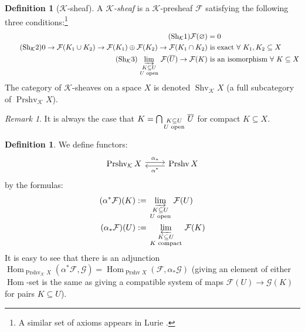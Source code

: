 \documentclass[12pt]{article}
\theoremstyle{definition}
\newtheorem{definition}[theorem]{Definition}
\theoremstyle{remark}
\newtheorem{remark}[theorem]{Remark}
\numberwithin{equation}{subsection}
\newcommand{\F}{\mathcal F}
\newcommand{\G}{\mathcal G}
\newcommand{\K}{\mathcal K}
\newcommand{\Hom}{\operatorname{Hom}}
\newcommand{\Prshv}{\operatorname{Prshv}}
\newcommand{\Shv}{\operatorname{Shv}}
\begin{document}
\begin{definition}[$\K$-sheaf]
A \emph{$\K$-sheaf} is a $\K$-presheaf $\F$ satisfying the following three conditions:\footnote{A similar set of axioms appears in Lurie \cite[Definition 7.3.4.1]{luriehtt}.}
\begin{align*}
\tag{Sh$_\K$1}\label{sheafvanishing}\F(\varnothing)&=0\\
\tag{Sh$_\K$2}\label{sheafproperty}0\to\F(K_1\cup K_2)\to\F(K_1)\oplus\F(K_2)\to\F(K_1\cap K_2)&\text{ is exact }\forall\text{ }K_1,K_2\subseteq X\\
\tag{Sh$_\K$3}\label{sheafcontinuity}\varinjlim_{\begin{smallmatrix}K\subseteq U\cr U\textrm{ open}\end{smallmatrix}}\F(\overline U)\to\F(K)&\text{ is an isomorphism }\forall\text{ }K\subseteq X
\end{align*}
The category of $\K$-sheaves on a space $X$ is denoted $\Shv_\K X$ (a full subcategory of $\Prshv_\K X$).
\end{definition}

\begin{remark}\label{nbhdintersectiongood}
It is always the case that $K=\bigcap_{\begin{smallmatrix}K\subseteq U\cr U\textrm{ open}\end{smallmatrix}}\overline U$ for compact $K\subseteq X$.
\end{remark}

\begin{definition}\label{opencptrelationfunctors}
We define functors:
\begin{equation}
\begin{tikzcd}\Prshv_\K X\ar[yshift=0.5ex]{r}{\alpha_\ast}&\ar[yshift=-0.5ex]{l}{\alpha^\ast}\Prshv X\end{tikzcd}
\end{equation}
by the formulas:
\begin{align}
\label{alphaast}(\alpha^\ast\F)(K)&:=\varinjlim_{\begin{smallmatrix}K\subseteq U\cr U\textrm{ open}\end{smallmatrix}}\F(U)\\
\label{alphaupperast}(\alpha_\ast\F)(U)&:=\varprojlim_{\begin{smallmatrix}K\subseteq U\cr K\textrm{ compact}\end{smallmatrix}}\F(K)
\end{align}
It is easy to see that there is an adjunction $\Hom_{\Prshv_\K X}(\alpha^\ast\F,\G)=\Hom_{\Prshv X}(\F,\alpha_\ast\G)$ (giving an element of either $\Hom$-set is the same as giving a compatible system of maps $\F(U)\to\G(K)$ for pairs $K\subseteq U$).  
\end{definition}
\end{document}
